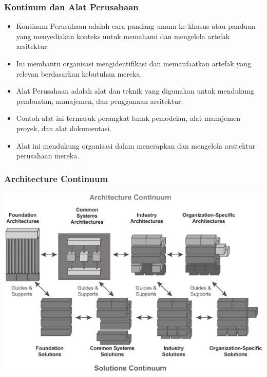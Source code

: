 \documentclass[aspectratio=169]{beamer}
\begin{document}
	\begin{frame}
		\frametitle{Kontinum dan Alat Perusahaan}
		\begin{itemize}
			\item Kontinum Perusahaan adalah cara pandang umum-ke-khusus atau panduan yang menyediakan konteks untuk memahami dan mengelola artefak arsitektur.
			\item Ini membantu organisasi mengidentifikasi dan memanfaatkan artefak yang relevan berdasarkan kebutuhan mereka.
			\item Alat Perusahaan adalah alat dan teknik yang digunakan untuk mendukung pembuatan, manajemen, dan penggunaan arsitektur.
			\item Contoh alat ini termasuk perangkat lunak pemodelan, alat manajemen proyek, dan alat dokumentasi.
			\item Alat ini mendukung organisasi dalam menerapkan dan mengelola arsitektur perusahaan mereka.
		\end{itemize}
	\end{frame}
	
	{
		\begin{frame}
			\frametitle{Architecture Continuum}
			\begin{center}
				\includegraphics[width=.80\textwidth]{../figures/enterprise_continuum}
			\end{center}
		\end{frame}
	}
	
\end{document}
